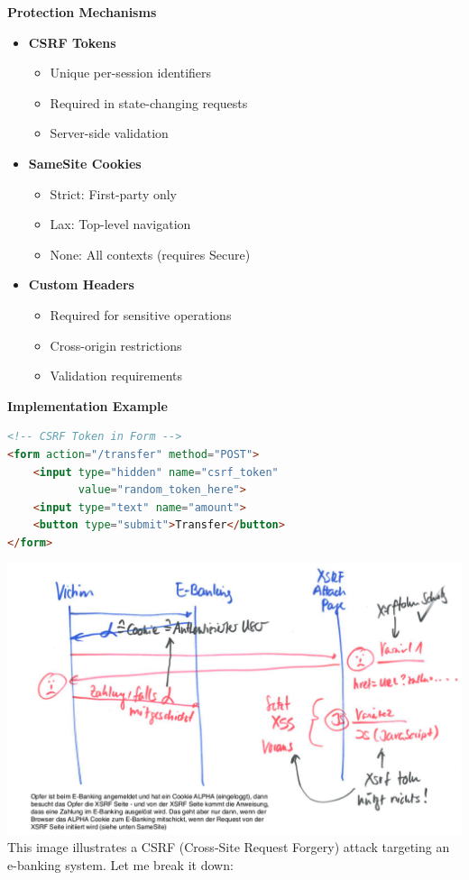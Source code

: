 \textbf{Protection Mechanisms}
\begin{itemize}
    \item \textbf{CSRF Tokens}
        \begin{itemize}
            \item Unique per-session identifiers
            \item Required in state-changing requests
            \item Server-side validation
        \end{itemize}
    
    \item \textbf{SameSite Cookies}
        \begin{itemize}
            \item Strict: First-party only
            \item Lax: Top-level navigation
            \item None: All contexts (requires Secure)
        \end{itemize}
        
    \item \textbf{Custom Headers}
        \begin{itemize}
            \item Required for sensitive operations
            \item Cross-origin restrictions
            \item Validation requirements
        \end{itemize}
\end{itemize}

\textbf{Implementation Example}
\begin{lstlisting}[language=html]
<!-- CSRF Token in Form -->
<form action="/transfer" method="POST">
    <input type="hidden" name="csrf_token" 
           value="random_token_here">
    <input type="text" name="amount">
    <button type="submit">Transfer</button>
</form>
\end{lstlisting}

\includegraphics[width=\textwidth]{resources/08-xsrf.png}
This image illustrates a CSRF (Cross-Site Request Forgery) attack targeting an e-banking system. Let me break it down:

